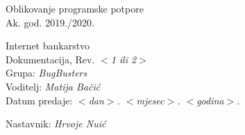 \documentclass[12pt]{report}
\begin{document}
	

	\begin{titlepage}
		\begin{center}
			\LARGE Oblikovanje programske potpore\\
			\large Ak. god. 2019./2020.\\
			
			
			\huge Internet bankarstvo\\
			\Large Dokumentacija, Rev. \textit{$<$1 ili 2$>$}\\
			
			\normalsize
			Grupa: \textit{BugBusters}\\
			Voditelj: \textit{Matija Bačić}\\
			
			
			Datum predaje: \textit{$<$dan$>$. $<$mjesec$>$. $<$godina$>$.}\\
	
			
			Nastavnik: \textit{Hrvoje Nuić}\\
		
		\end{center}

	
	\end{titlepage}

	
	\tableofcontents

	
	
	
	
	
	
	
	
	
	\begingroup
	\renewcommand*\listfigurename{Indeks slika i dijagrama}
	\listoffigures
	\endgroup


	
	\eject 
		
	
\end{document}
